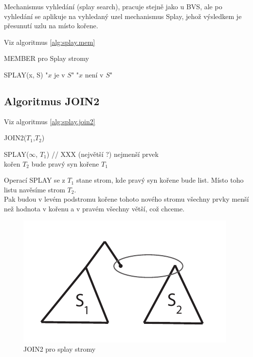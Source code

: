 Mechanismus vyhledání (splay search), pracuje stejně jako u BVS, ale 
po vyhledání se aplikuje na vyhledaný uzel mechanismus Splay, jehož 
výsledkem je přesunutí uzlu na místo kořene. 

Viz algoritmus \ref{alg:splay.mem}

\begin{algorithm}[!htb]
\caption{MEMBER pro Splay stromy}
\label{alg:splay.mem}
\begin{algorithmic}
\STATE SPLAY(x, S)
  \STATE "$x$ je v $S$"
\ELSE 
  \STATE "$x$ není v $S$"
\ENDIF
\end{algorithmic}
\end{algorithm}

\subsection{Algoritmus JOIN2}

Viz algoritmus \ref{alg:splay.join2}

\begin{algorithm}[!htb]
\caption{JOIN2($T_1$,$T_2$)}
\label{alg:splay.join2}
\begin{algorithmic}
\STATE SPLAY($\infty$, $T_1$) // XXX (největší ?) nejmenší prvek \\
\STATE kořen $T_2$ bude pravý syn kořene $T_1$
\end{algorithmic}
\end{algorithm}

Operací SPLAY se z $T_1$ stane strom, kde pravý syn kořene bude list. 
Místo toho listu navěsíme strom $T_2$. \\
Pak budou v levém podstromu kořene tohoto nového stromu všechny prvky 
menší než hodnota v kořenu a v pravém všechny větší, což chceme.

\begin{figure}[!htb]
\centering\includegraphics{pics/splay-join2}
\caption{JOIN2 pro splay stromy}
\label{splay-join2}
\end{figure}


